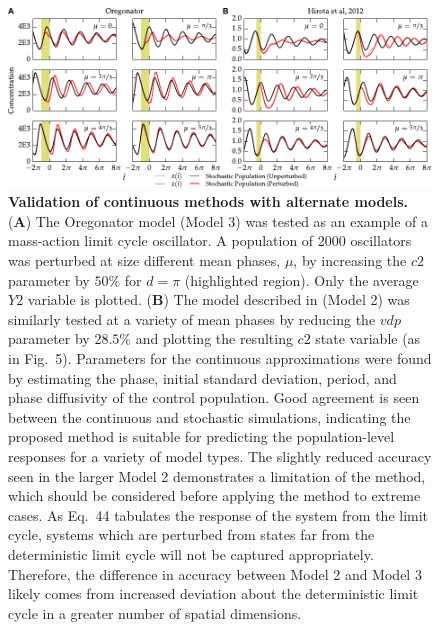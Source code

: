 \documentclass[11pt, letterpaper]{article}
\providecommand{\DIFadd}[1]{{\protect\color{blue}#1}} %
\providecommand{\DIFaddFL}[1]{\DIFadd{#1}} %
\providecommand{\DIFaddbeginFL}{} %
\providecommand{\DIFaddendFL}{} %
\begin{document}
\begin{figure}[h!]
  \begin{center}
    \includegraphics[width=\textwidth]{figures/figure_S3.pdf}
    \caption{
{\bfseries Validation of continuous methods with alternate models.}
({\bfseries A}) The Oregonator model (Model 3) was tested as an example of a mass-action limit cycle oscillator.
A population of 2000 oscillators was perturbed at size different mean phases, $\mu$, by increasing the $\mathit{c2}$ parameter by $50\%$ for $d=\pi$ (highlighted region).
Only the average $\mathit{Y2}$ variable is plotted.
({\bfseries B}) The model described in \cite{Hirota2012} (Model 2) was similarly tested at a variety of mean phases by reducing the $\mathit{vdp}$ parameter by $28.5\%$ and plotting the resulting $\mathit{c2}$ state variable (as in Fig.~5).
Parameters for the continuous approximations were found by estimating the phase, initial standard deviation, period, and phase diffusivity of the control population.
Good agreement is seen between the continuous and stochastic simulations, indicating the proposed method is suitable for predicting the population-level responses for a variety of model types.
\DIFaddbeginFL \DIFaddFL{The slightly reduced accuracy seen in the larger Model 2 demonstrates a limitation of the method, which should be considered before applying the method to extreme cases.
As Eq.~44 tabulates the response of the system from the limit cycle, systems which are perturbed from states far from the deterministic limit cycle will not be captured appropriately.
Therefore, the difference in accuracy between Model 2 and Model 3 likely comes from increased deviation about the deterministic limit cycle in a greater number of spatial dimensions.
}\DIFaddendFL }
\DIFaddbeginFL \end{center}
\end{figure}
\end{document}
